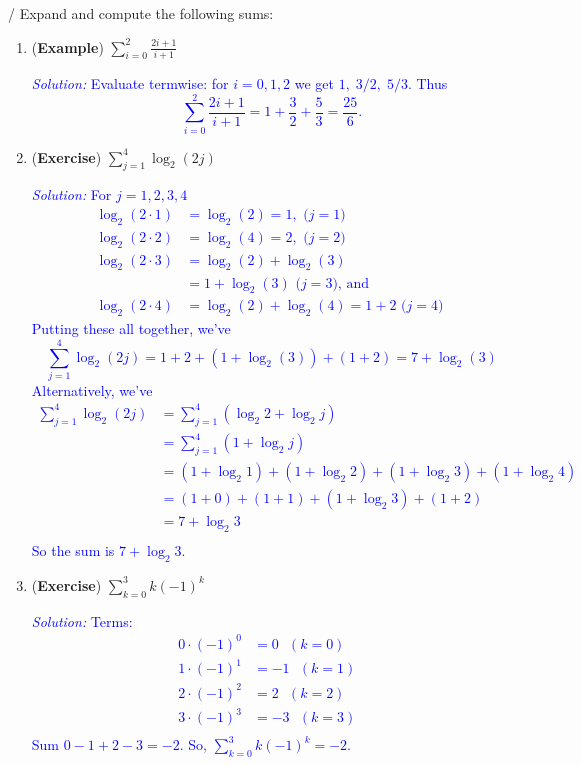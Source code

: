 \documentclass[10pt]{article}
\begin{document}
{\example / \exercise} Expand and compute the following sums:
\begin{enumerate}
    \item[(a)] ({\bf\color{blue}Example}) $\displaystyle\sum_{i=0}^2 \frac{2i+1}{i+1}$
        \par\noindent\textcolor{blue}{\emph{Solution:} Evaluate termwise: for $i=0,1,2$ we get $1,\;3/2,\;5/3$. Thus
        \[
        \sum_{i=0}^2 \frac{2i+1}{i+1}=1+\frac32+\frac53=\frac{25}{6}.
        \]}
        \vfill
    \item[(b)] ({\bf\color{blue}Exercise}) $\displaystyle\sum_{j=1}^4 \log_2\left( 2j\right)$
        \par\noindent\textcolor{blue}{\emph{Solution:} For $j = 1,2,3,4$
        \begin{align*}
        \log_2(2\cdot 1)&= \log_2(2) = 1, \text{ ($j = 1$) }\\
        \log_2(2\cdot 2) &= \log_2(4) = 2, \text{ ($j = 2$) }\\
        \log_2(2\cdot 3) &= \log_2(2) + \log_2(3)\\
        &= 1 + \log_2(3) \text{ ($j = 3$),  and }\\
        \log_2(2\cdot 4) &= \log_2(2) + \log_2(4)= 1 + 2 \text{ ($j = 4$) }
        \end{align*}
        Putting these all together, we've 
        $$\displaystyle\sum_{j=1}^4 \log_2\left( 2j\right) = 1 + 2 + (1 + \log_2(3)) + (1 + 2) = 7 + \log_2(3)$$
        Alternatively, we've 
        \begin{align*}
        \sum_{j=1}^4 \log_2(2j)&= \sum_{j=1}^4 (\log_2 2 +\log_2 j)\\
        &= \sum_{j=1}^4 (1+\log_2 j)\\
        &= (1+\log_2 1) + (1 + \log_2 2) + (1 + \log_2 3) + (1 + \log_2 4)\\
        &= (1 + 0) + (1 + 1) + (1 + \log_2 3) + (1 + 2)\\
        &= 7+\log_2 3\\
        \end{align*}
        So the sum is $7+\log_2 3$. }
        \vfill
    \item[(c)] ({\bf\color{blue}Exercise}) $\displaystyle\sum_{k=0}^3 k(-1)^k$
        \par\noindent\textcolor{blue}{\emph{Solution:} Terms: 
        \begin{align*}
            0\cdot (-1)^{0} &= 0 \text{ $(k = 0)$ }\\
            1\cdot (-1)^{1} &= -1 \text{ $(k = 1)$ }\\
            2\cdot (-1)^{2} &= 2 \text{ $(k = 2)$ }\\
            3\cdot (-1)^{3} &= -3 \text{ $(k = 3)$ }\\
        \end{align*}
        Sum $0-1+2-3=-2$. So, $\displaystyle\sum_{k=0}^3 k(-1)^k = -2$.}
        \vfill
\end{enumerate}
\end{document}
